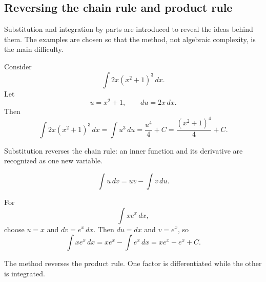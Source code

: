 \subsection{Reversing the chain rule and product rule}

\begin{corebox}
Substitution and integration by parts are introduced to reveal the ideas behind them. The examples are chosen so that the method, not algebraic complexity, is the main difficulty.
\end{corebox}

\begin{examplebox}
Consider
\[
\int 2x(x^2+1)^3\,dx.
\]
Let
\[
u=x^2+1,
\qquad du=2x\,dx.
\]
Then
\[
\int 2x(x^2+1)^3\,dx=\int u^3\,du=\frac{u^4}{4}+C
=\frac{(x^2+1)^4}{4}+C.
\]
\end{examplebox}

\begin{interpretationbox}[Substitution]
Substitution reverses the chain rule: an inner function and its derivative are recognized as one new variable.
\end{interpretationbox}

\begin{theorembox}
\[
\int u\,dv=uv-\int v\,du.
\]
\end{theorembox}

\begin{examplebox}
For
\[
\int xe^x\,dx,
\]
choose $u=x$ and $dv=e^x\,dx$. Then $du=dx$ and $v=e^x$, so
\[
\int xe^x\,dx=xe^x-\int e^x\,dx=xe^x-e^x+C.
\]
\end{examplebox}

\begin{interpretationbox}
The method reverses the product rule. One factor is differentiated while the other is integrated.
\end{interpretationbox}
